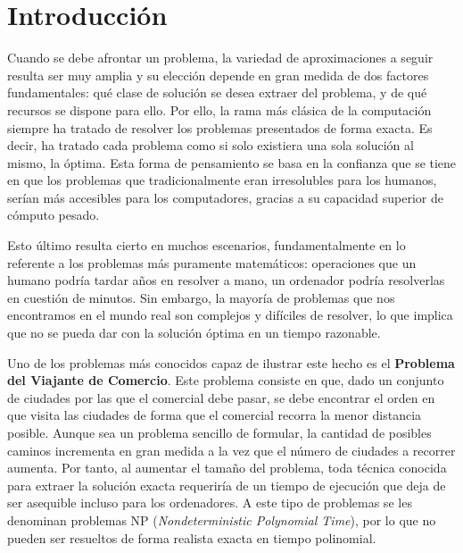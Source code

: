 \chapter{Introducción}

Cuando se debe afrontar un problema, la variedad de aproximaciones a seguir resulta ser muy amplia y su elección depende en gran medida de dos factores fundamentales: qué clase de solución se desea extraer del problema, y de qué recursos se dispone para ello. 
Por ello, la rama más clásica de la computación siempre ha tratado de resolver los problemas presentados de forma exacta. 
Es decir, ha tratado cada problema como si solo existiera una sola solución al mismo, la óptima. 
Esta forma de pensamiento se basa en la confianza que se tiene en que los problemas que tradicionalmente eran irresolubles para los humanos, serían más accesibles para los computadores, gracias a su capacidad superior de cómputo pesado.

Esto último resulta cierto en muchos escenarios, fundamentalmente en lo referente a los problemas más puramente matemáticos: operaciones que un humano podría tardar años en resolver a mano, un ordenador podría resolverlas en cuestión de minutos. 
Sin embargo, la mayoría de problemas que nos encontramos en el mundo real son complejos y difíciles de resolver, lo que implica que no se pueda dar con la solución óptima en un tiempo razonable. 

Uno de los problemas más conocidos capaz de ilustrar este hecho es el \textbf{Problema del Viajante de Comercio}. 
Este problema consiste en que, dado un conjunto de ciudades por las que el comercial debe pasar, se debe encontrar el orden en que visita las ciudades de forma que el comercial recorra la menor distancia posible. 
Aunque sea un problema sencillo de formular, la cantidad de posibles caminos incrementa en gran medida a la vez que el número de ciudades a recorrer aumenta. 
Por tanto, al aumentar el tamaño del problema, toda técnica conocida para extraer la solución exacta requeriría de un tiempo de ejecución que deja de ser asequible incluso para los ordenadores. 
A este tipo de problemas se les denominan problemas NP (\textit{Nondeterministic Polynomial Time}), por lo que no pueden ser resueltos de forma realista exacta en tiempo polinomial. 

